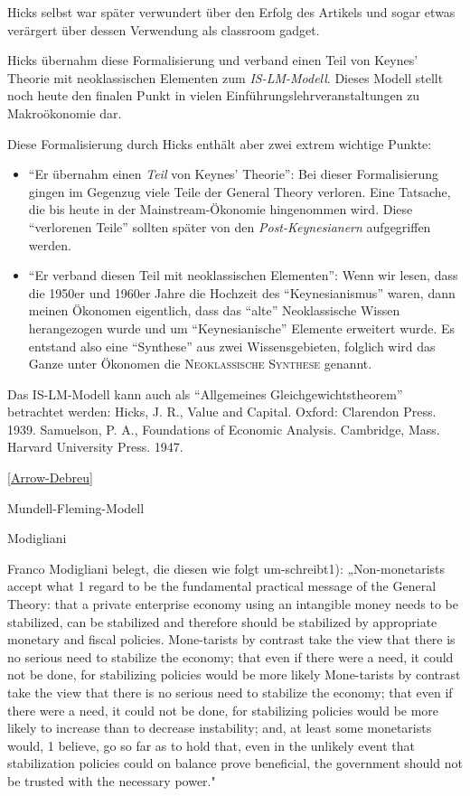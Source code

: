 Hicks selbst war später verwundert über den Erfolg des Artikels und sogar etwas verärgert über dessen Verwendung als classroom gadget. 


Hicks  übernahm diese Formalisierung und verband einen Teil von Keynes' Theorie mit neoklassischen Elementen zum \textit{IS-LM-Modell}. Dieses Modell stellt noch heute den finalen Punkt in vielen Einführungslehrveranstaltungen zu Makroökonomie dar.

Diese Formalisierung durch Hicks enthält aber zwei extrem wichtige Punkte:
\begin{itemize}
	\item "`Er übernahm einen \textit{Teil} von Keynes' Theorie"': Bei dieser Formalisierung gingen im Gegenzug viele Teile der General Theory verloren. Eine Tatsache, die bis heute in der Mainstream-Ökonomie hingenommen wird. Diese "`verlorenen Teile"' sollten später von den \textit{Post-Keynesianern} aufgegriffen werden.
	\item "`Er verband diesen Teil mit neoklassischen Elementen"': Wenn wir lesen, dass die 1950er und 1960er Jahre die Hochzeit des "`Keynesianismus"' waren, dann meinen Ökonomen eigentlich, dass das "`alte"' Neoklassische Wissen herangezogen wurde und um "`Keynesianische"' Elemente erweitert wurde. Es entstand also eine "`Synthese"' aus zwei Wissensgebieten, folglich wird das Ganze unter Ökonomen die \textsc{Neoklassische Synthese} genannt.
\end{itemize}






Das IS-LM-Modell kann auch als "`Allgemeines Gleichgewichtstheorem"' betrachtet werden:
Hicks, J. R., Value and Capital. Oxford: Clarendon Press. 1939.
Samuelson, P. A., Foundations of Economic Analysis. Cambridge, Mass. Harvard University Press. 1947.

\ref{Arrow-Debreu}




Mundell-Fleming-Modell


Modigliani

Franco Modigliani belegt, die diesen wie folgt um-schreibt1): „Non-monetarists accept what 1 regard to be the fundamental practical message of the General Theory: that a private enterprise economy using an intangible money needs to be stabilized, can be stabilized and therefore should be stabilized by appropriate monetary and fiscal policies. Mone-tarists by contrast take the view that there is no serious need to stabilize the economy; that even if there were a need, it could not be done, for stabilizing policies would be more likely
Mone-tarists by contrast take the view that there is no serious need to stabilize the economy; that even if there were a need, it could not be done, for stabilizing policies would be more likely to increase than to decrease instability; and, at least some monetarists would, 1 believe, go so far as to hold that, even in the unlikely event that stabilization policies could on balance prove beneficial, the government should not be trusted with the necessary power."

